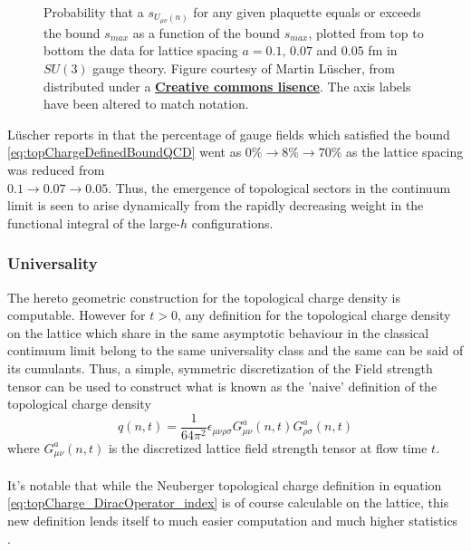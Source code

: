 \documentclass[a4paper,10pt]{article}
\begin{document}
\begin{figure}[H]
\centering
{}


\caption[]{Probability that a $s_{U_{\mu \nu}(n)}$ for any given plaquette equals or exceeds the bound $s_{max}$ as a function of the bound $s_{max}$, plotted from top to bottom the data for lattice spacing $a=0.1,\,0.07$ and $0.05$ fm in $SU(3)$ gauge theory. Figure courtesy of Martin Lüscher, from \cite{Luscher2010} distributed under a \href{https://creativecommons.org/licenses/by/4.0/}{\textbf{Creative commons lisence}}. The axis labels have been altered to match notation.}\label{fig:latticeSpacingexceedingBound}
\end{figure}
Lüscher reports in \cite{Luscher2010} that the percentage of gauge fields which satisfied the bound \eqref{eq:topChargeDefinedBoundQCD} went as
$0\%\rightarrow 8\%\rightarrow 70\%$ as the lattice spacing was reduced from\\$0.1\rightarrow0.07\rightarrow0.05$.
Thus, the emergence of topological sectors in the continuum limit is seen to arise dynamically from the rapidly decreasing weight in the functional integral of the large-$h$ configurations.
\subsubsection{Universality}
The hereto geometric construction for the topological charge density is computable. However for $t>0$, any definition for the topological charge density on the lattice which share in the same asymptotic behaviour in the classical continuum limit belong to the same universality class \cite{Luscher2010}\cite{L_scher_2011} and the same can be said of its cumulants. Thus, a simple, symmetric discretization of the Field strength tensor can be used to construct what is known as the 'naive' definition of the topological charge density 
\begin{equation}\label{eq:topChargeDensity_flowed_lattice}
q(n, t)=\frac{1}{64 \pi^{2}} \epsilon_{\mu \nu \rho \sigma} G_{\mu \nu}^{a}(n, t) G_{\rho \sigma}^{a}(n, t)
\end{equation}
where $G_{\mu \nu}^{a}(n, t)$ is the discretized lattice field strength tensor at flow time $t$.\\\\It's notable that while the Neuberger topological charge definition in equation \eqref{eq:topCharge_DiracOperator_index} is of course calculable on the lattice, this new definition lends itself to much easier computation and much higher statistics \cite{PhysRevLett.94.032003}\cite{non_gaussianities2015}.
\end{document}
